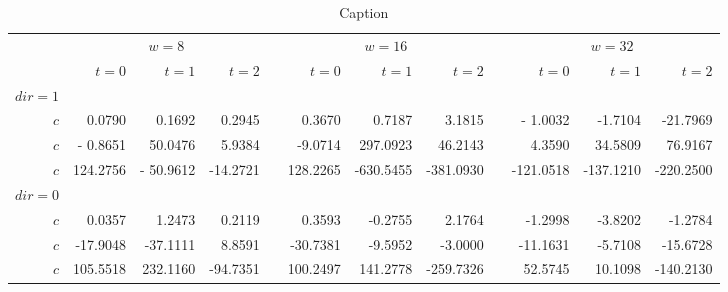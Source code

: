 \documentclass[11pt]{article}
\newcommand{\ra}[1]{\renewcommand{\arraystretch}{#1}}
\begin{document}
\begin{linenumbers}
\begin{table}
\centering
\ra{1.3}
\begin{tabular}{@{}rrrrcrrrcrrr@{}}\toprule &
\multicolumn{3}{c}{$w = 8$} & \phantom{abc} & \multicolumn{3}{c}{$w = 16$} & \phantom{abc} & \multicolumn{3}{c}{$w = 32$} \\
\cmidrule{2-4} \cmidrule{6-8} \cmidrule{10-12} &
 $t=0$ & $t=1$ & $t=2$ && $t=0$ & $t=1$ & $t=2$ && $t=0$ & $t=1$ & $t=2$\\
\midrule
$dir=1$ \\
$c$ & 0.0790 & 0.1692 & 0.2945 && 0.3670 & 0.7187 & 3.1815 && - 1.0032 & -1.7104 & -21.7969 \\
$c$ &  - 0.8651  & 50.0476& 5.9384 & & -9.0714& 297.0923& 46.2143&& 4.3590& 34.5809& 76.9167 \\
$c$ & 124.2756& - 50.9612& -14.2721&& 128.2265& -630.5455& -381.0930&& -121.0518& -137.1210& -220.2500 \\
$dir=0$ \\
$c$ & 0.0357& 1.2473& 0.2119&& 0.3593& -0.2755& 2.1764&& -1.2998& -3.8202& -1.2784 \\
$c$ & -17.9048& -37.1111& 8.8591&& -30.7381& -9.5952& -3.0000&& -11.1631& -5.7108& -15.6728 \\
$c$ & 105.5518& 232.1160&
-94.7351&& 100.2497& 141.2778& -259.7326&& 52.5745& 10.1098& -140.2130\\
\bottomrule
\end{tabular}
\caption{Caption}
\end{table}



\end{linenumbers}

\baselineskip13pt
\pagebreak

\end{document}

